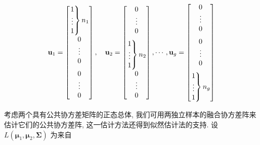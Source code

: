 \[
\mathbf{u}_1=\left[\begin{array}{@{}c@{}}
\left.\begin{array}{@{}c@{}}1\\\vdots\\1\end{array}\right\}n_1\\[6pt]
0\\\vdots\\0\\[6pt]
0\\\vdots\\0
\end{array}\right],\quad
\mathbf{u}_2=\left[\begin{array}{@{}c@{}}
0\\\vdots\\0\\[6pt]
\left.\begin{array}{@{}c@{}}1\\\vdots\\1\end{array}\right\}n_2\\[6pt]
0\\\vdots\\0
\end{array}\right],\cdots,
\mathbf{u}_g=\left[\begin{array}{@{}c@{}}
0\\\vdots\\0\\[6pt]
0\\\vdots\\0\\[6pt]
\left.\begin{array}{@{}c@{}}1\\\vdots\\1\end{array}\right\}n_g
\end{array}\right]
\]

\quad 考虑两个具有公共协方差矩阵的正态总体, 我们可用两独立样本的融合协方差阵来估计它们的公共协方差阵, 这一估计方法还得到似然估计法的支持. 设 $L(\boldsymbol{\mu}_1,\boldsymbol{\mu}_2,\boldsymbol{\Sigma})$ 为来自
